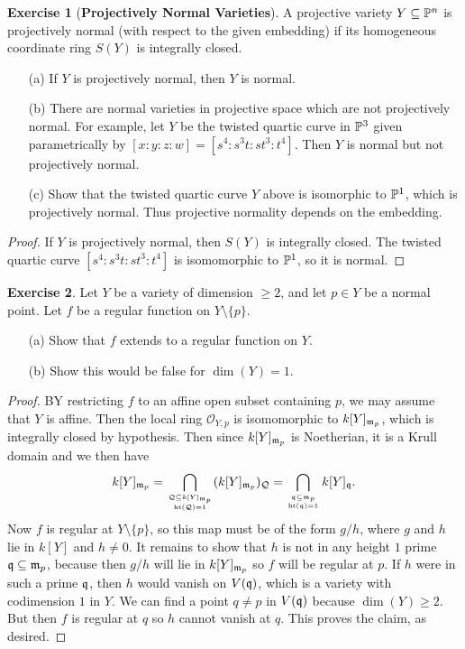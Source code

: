 \documentclass[11pt]{book}
\theoremstyle{definition}
\newtheorem{exercise}{Exercise}[section]
\begin{document}
\begin{exercise}[\textbf{Projectively Normal Varieties}]
A projective variety $Y\sub\P^n$ is projectively normal (with respect to the given embedding) if its homogeneous coordinate ring $S(Y)$ is integrally closed.
\begin{itemize}
\item[(a)] If $Y$ is projectively normal, then $Y$ is normal.
\item[(b)] There are normal varieties in projective space which are not projectively normal. For example, let $Y$ be the twisted quartic curve in $\P^3$ given parametrically by $[x:y:z:w]=[s^4:s^3t:st^3:t^4]$. Then $Y$ is normal but not projectively normal.
\item[(c)] Show that the twisted quartic curve $Y$ above is isomorphic to $\P^1$, which is projectively normal. Thus projective normality depends on the embedding.
\end{itemize}
\end{exercise}
\begin{proof}
If $Y$ is projectively normal, then $S(Y)$ is integrally closed. The twisted quartic curve $[s^4:s^3t:st^3:t^4]$ is isomomorphic to $\P^1$, so it is normal.
\end{proof}
\begin{exercise}
Let $Y$ be a variety of dimension $\geq 2$, and let $p\in Y$ be a normal point. Let $f$ be a regular function on $Y\setminus\{p\}$.
\begin{itemize}
\item[(a)] Show that $f$ extends to a regular function on $Y$.
\item[(b)] Show this would be false for $\dim(Y)=1$.
\end{itemize}
\end{exercise}
\begin{proof}
BY restricting $f$ to an affine open subset containing $p$, we may assume that $Y$ is affine. Then the local ring $\mathcal{O}_{Y,p}$ is isomomorphic to $k[Y]_{\m_p}$, which is integrally closed by hypothesis. Then since $k[Y]_{\m_p}$ is Noetherian, it is a Krull domain and we then have
\[k[Y]_{\m_p}=\bigcap_{\mathcal{Q}\sub k[Y]_{\m_p}\atop\height(\mathcal{Q})=1}(k[Y]_{\m_p})_{\mathcal{Q}}=\bigcap_{\q\sub\m_p\atop \height(\q)=1}k[Y]_{\q}.\]
Now $f$ is regular at $Y\setminus\{p\}$, so this map must be of the form $g/h$, where $g$ and $h$ lie in $k[Y]$ and $h\neq 0$. It remains to show that $h$ is not in any height $1$ prime $\q\sub\m_p$, because then $g/h$ will lie in $k[Y]_{\m_p}$ so $f$ will be regular at $p$. If $h$ were in such a prime $\q$, then $h$ would vanish on $V(\q)$, which is a variety with codimension $1$ in $Y$. We can find a point $q\neq p$ in $V(\q)$ because $\dim(Y)\geq 2$. But then $f$ is regular at $q$ so $h$ cannot vanish at $q$. This proves the claim, as desired.
\end{proof}
\end{document}
